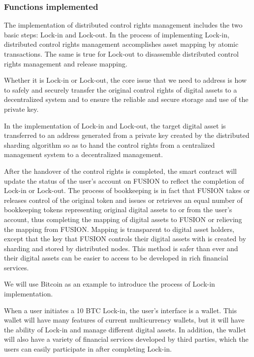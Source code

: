 \documentclass[a4paper,12pt]{article}
\begin{document}
\subsubsection{Functions implemented}

The implementation of distributed control rights management includes the two basic steps: Lock-in and Lock-out. In the process of implementing Lock-in, distributed control rights management accomplishes asset mapping by atomic transactions. The same is true for Lock-out to disassemble distributed control rights management and release mapping.

Whether it is Lock-in or Lock-out, the core issue that we need to address is how to safely and securely transfer the original control rights of digital assets to a decentralized system and to ensure the reliable and secure storage and use of the private key.

In the implementation of Lock-in and Lock-out, the target digital asset is transferred to an address generated from a private key created by the distributed sharding algorithm so as to hand the control rights from a centralized management system to a decentralized management.

After the handover of the control rights is completed, the smart contract will update the status of the user's account on FUSION to reflect the completion of Lock-in or Lock-out. The process of bookkeeping is in fact that FUSION takes or releases control of the original token and issues or retrieves an equal number of bookkeeping tokens representing original digital assets to or from the user's account, thus completing the mapping of digital assets to FUSION or relieving the mapping from FUSION. Mapping is transparent to digital asset holders, except that the key that FUSION controls their digital assets with is created by sharding and stored by distributed nodes. This method is safer than ever and their digital assets can be easier to access to be developed in rich financial services.

We will use Bitcoin as an example to introduce the process of Lock-in implementation.

When a user initiates a 10 BTC Lock-in, the user's interface is a wallet. This wallet will have many features of current multicurrency wallets, but it will have the ability of Lock-in and manage different digital assets. In addition, the wallet will also have a variety of financial services developed by third parties, which the users can easily participate in after completing Lock-in.
\end{document}
